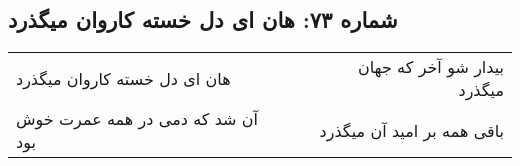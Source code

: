 \begin{center}
\section*{شماره ۷۳: هان ای دل خسته کاروان میگذرد}
\label{sec:073}
\begin{longtable}{l p{0.5cm} r}
هان ای دل خسته کاروان میگذرد
&&
بیدار شو آخر که جهان میگذرد
\\
آن شد که دمی در همه عمرت خوش بود
&&
باقی همه بر امید آن میگذرد
\\
\end{longtable}
\end{center}
